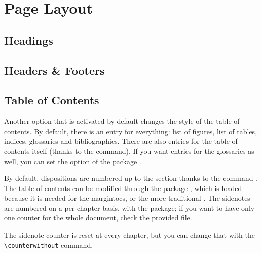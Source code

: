 \setchapterpreamble[u]{\margintoc[*-6]}
\chapter{Page Layout}

\section{Headings}

\blindtext

\section{Headers \& Footers}

\blindtext

\section{Table of Contents}

Another option that is activated by default changes the style of the 
table of contents. By default, there is an entry for everything: list of 
figures, list of tables, indices, glossaries and bibliographies. There 
are also entries for the table of contents itself (thanks to the 
 command). If you want entries for the 
glossaries as well, you can set the  option of the package 
.

By default, dispositions are numbered up to the section thanks to the 
command . The table of contents 
can be modified through the package , which is loaded 
because it is needed for the margintocs, or the more traditional 
. The sidenotes are numbered on a per-chapter basis, 
with the  package; if you want to have only one 
counter for the whole document, check the provided  
file.


The sidenote counter is reset at every chapter, but you can change that 
with the \verb|\counterwithout| command.
